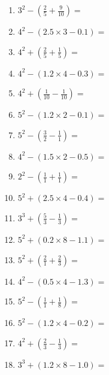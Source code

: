 \documentclass[12pt]{article}
\begin{document}
\begin{enumerate}
\item \large $ 3^{2} - (\frac{2}{5} + \frac{9}{10}) = $ \vspace{1.6cm}
\item \large $ 4^{2} - (2.5 \times 3 - 0.1) = $ \vspace{1.6cm}
\item \large $ 4^{2} + (\frac{2}{5} + \frac{1}{5}) = $ \vspace{1.6cm}
\item \large $ 4^{2} - (1.2 \times 4 - 0.3) = $ \vspace{1.6cm}
\newpage
\item \large $ 4^{2} + (\frac{1}{10} - \frac{1}{10}) = $ \vspace{1.6cm}
\item \large $ 5^{2} - (1.2 \times 2 - 0.1) = $ \vspace{1.6cm}
\item \large $ 5^{2} - (\frac{3}{2} - \frac{1}{1}) = $ \vspace{1.6cm}
\item \large $ 4^{2} - (1.5 \times 2 - 0.5) = $ \vspace{1.6cm}
\item \large $ 2^{2} - (\frac{1}{1} + \frac{1}{1}) = $ \vspace{1.6cm}
\item \large $ 5^{2} + (2.5 \times 4 - 0.4) = $ \vspace{1.6cm}
\item \large $ 3^{3} + (\frac{5}{3} - \frac{1}{3}) = $ \vspace{1.6cm}
\item \large $ 5^{2} + (0.2 \times 8 - 1.1) = $ \vspace{1.6cm}
\item \large $ 5^{2} + (\frac{2}{1} + \frac{2}{3}) = $ \vspace{1.6cm}
\item \large $ 4^{2} - (0.5 \times 4 - 1.3) = $ \vspace{1.6cm}
\newpage
\item \large $ 5^{2} - (\frac{1}{1} + \frac{1}{8}) = $ \vspace{1.6cm}
\item \large $ 5^{2} - (1.2 \times 4 - 0.2) = $ \vspace{1.6cm}
\item \large $ 4^{2} + (\frac{2}{3} - \frac{1}{3}) = $ \vspace{1.6cm}
\item \large $ 3^{3} + (1.2 \times 8 - 1.0) = $ \vspace{1.6cm}

\end{enumerate}
\end{document}
